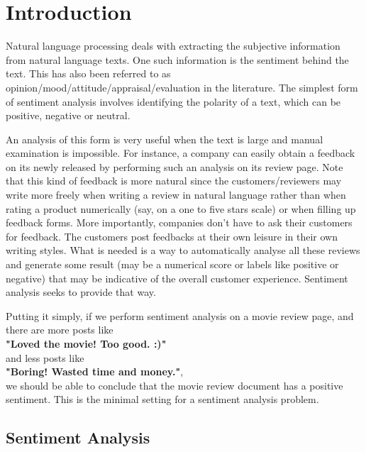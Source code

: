 \chapter{Introduction}\label{ch:introduction}
Natural language processing deals with extracting the subjective information from natural language texts.
One such information is the sentiment behind the text. This has also been referred to as opinion/mood/attitude/appraisal/evaluation in the literature.
The simplest form of sentiment analysis involves identifying the polarity of a text, which can be positive, negative or neutral. \vspace{8mm} 

An analysis of this form is very useful when the text is large and manual examination is impossible. For instance, a company can easily obtain a feedback on its newly released
by performing such an analysis on its review page. Note that this kind of feedback is more natural since the customers/reviewers may write more freely when writing a review
in natural language rather than when rating a product numerically (say, on a one to five stars scale) or when filling up feedback forms. More importantly, companies 
don't have to ask their customers for feedback. The customers post feedbacks at their own leisure in their own writing styles. What is needed is a way to automatically analyse all
these reviews and generate some result (may be a numerical score or labels like positive or negative) that may be indicative of the overall customer experience. Sentiment
analysis seeks to provide that way. \vspace{8mm} 

Putting it simply, if we perform sentiment analysis on a movie review page, and there are more posts like \vspace{8mm} \\
\textbf{"Loved the movie! Too good. :)"} \vspace{8mm} \\
and less posts like \vspace{8mm} \\
\textbf{"Boring! Wasted time and money."}, \vspace{8mm} \\  
we should be able to conclude that the movie review document has a positive sentiment. This is the minimal setting for a sentiment analysis problem.

\section{Sentiment Analysis}

